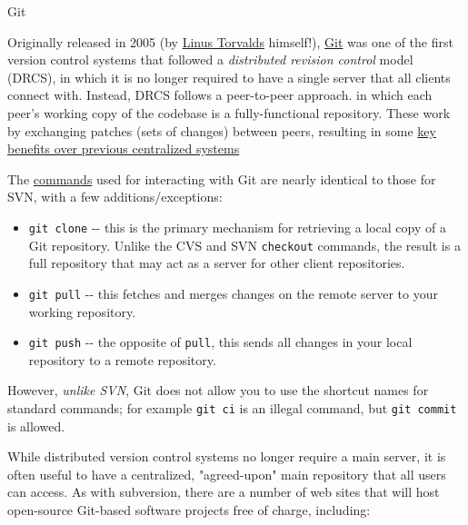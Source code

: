 \documentclass[aspectratio=169]{beamer}
\begin{document}
\begin{frame}{Git}

Originally released in 2005 (by
\href{https://en.wikipedia.org/wiki/Linus_Torvalds}{Linus Torvalds}
himself!), \href{https://en.wikipedia.org/wiki/Git_(software)}{Git} was
one of the first version control systems that followed a
\emph{distributed revision control} model (DRCS), in which it is no
longer required to have a single server that all clients connect with.
Instead, DRCS follows a peer-to-peer approach. in which each peer's
working copy of the codebase is a fully-functional repository. These
work by exchanging patches (sets of changes) between peers, resulting in
some
\href{https://en.wikipedia.org/wiki/Distributed_revision_control\#Distributed_vs._centralized}{key
benefits over previous centralized systems}

The
\href{https://confluence.atlassian.com/display/STASH/Basic+Git+commands}{commands}
used for interacting with Git are nearly identical to those for SVN,
with a few additions/exceptions:

\end{frame}

\begin{frame}{}

\begin{itemize}
\item
  \texttt{git\ clone} -\/- this is the primary mechanism for retrieving
  a local copy of a Git repository. Unlike the CVS and SVN
  \texttt{checkout} commands, the result is a full repository that may
  act as a server for other client repositories.
\item
  \texttt{git\ pull} -\/- this fetches and merges changes on the remote
  server to your working repository.
\item
  \texttt{git\ push} -\/- the opposite of \texttt{pull}, this sends all
  changes in your local repository to a remote repository.
\end{itemize}

\end{frame}

\begin{frame}{}

However, \emph{unlike SVN}, Git does not allow you to use the shortcut
names for standard commands; for example \texttt{git\ ci} is an illegal
command, but \texttt{git\ commit} is allowed.

While distributed version control systems no longer require a main
server, it is often useful to have a centralized, "agreed-upon" main
repository that all users can access. As with subversion, there are a
number of web sites that will host open-source Git-based software
projects free of charge, including:

\end{frame}
\end{document}

